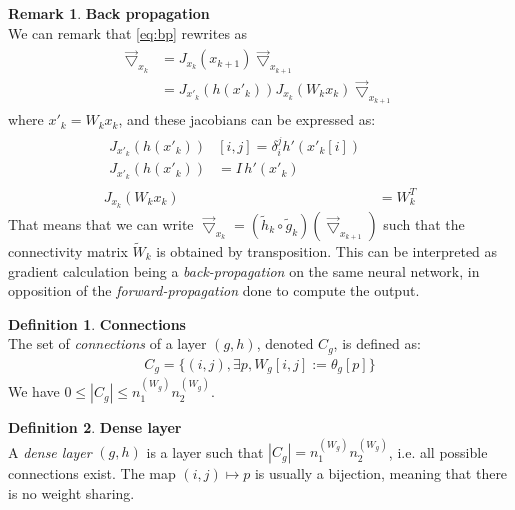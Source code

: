 \documentclass{article}
\theoremstyle{definition}
\newtheorem{definition}{Definition}[section]
\newtheorem{remark}{Remark}
\newcommand{\ovec}{}
\begin{document}
\begin{remark}\textbf{Back propagation}\\

We can remark that \eqref{eq:bp} rewrites as
\begin{align}
  \begin{split}
  \vec{\bigtriangledown}_{x_k} & = J_{x_k}(\ovec{x_{k+1}}) \vec{\bigtriangledown}_{x_{k+1}} \\ 
                               & = J_{x'_k}(h(x'_k)) J_{x_k}(W_k x_k) \vec{\bigtriangledown}_{x_{k+1}}
  \end{split}
\end{align}
where $x'_k = W_k x_k$, and these jacobians can be expressed as:
\begin{align}
  \begin{split}
  J_{x'_k}(h(x'_k)) & [i,j] = \delta_i^j h'(x'_k[i])\\
  J_{x'_k}(h(x'_k)) & = I \hspace{2pt} h'(x'_k)
  \end{split}\\
  J_{x_k}(W_k x_k) & = W_k^T
\end{align}
That means that we can write $\vec{\bigtriangledown}_{x_k} = (\widetilde{h}_k \circ \widetilde{g}_k)(\vec{\bigtriangledown}_{x_{k+1}})$ such that the connectivity matrix $\widetilde{W}_k$ is obtained by transposition. This can be interpreted as gradient calculation being a \emph{back-propagation} on the same neural network, in opposition of the \emph{forward-propagation} done to compute the output.
\end{remark}

\begin{definition}\textbf{Connections}\\
The set of \emph{connections} of a layer $(g,h)$, denoted $C_g$, is defined as:
\begin{gather*}
  C_g = \{(i,j), \exists p, W_g[i,j] := \theta_g[p]\}
\end{gather*}
We have $0 \leq |C_g| \leq n_1^{(W_g)} n_2^{(W_g)}$.
\end{definition}

\begin{definition}\textbf{Dense layer}\\
A \textit{dense layer} $(g,h)$ is a layer such that $|C_g| = n_1^{(W_g)} n_2^{(W_g)}$, i.e. all possible connections exist. The map $(i,j) \mapsto p$ is usually a bijection, meaning that there is no weight sharing.
\end{definition}
\end{document}
